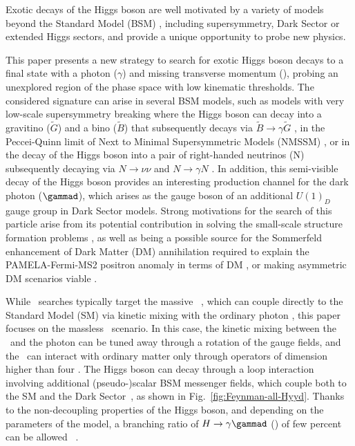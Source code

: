 Exotic decays of the Higgs boson are well motivated by a variety of models beyond the Standard Model (BSM) \cite{Curtin_2014}, including supersymmetry, Dark Sector or extended Higgs sectors, and provide a unique opportunity to probe new physics.  

This paper presents a new strategy to search for exotic Higgs boson decays to a final state with a photon ($\gamma$) and missing transverse momentum (\ETmiss), probing an unexplored region of the  phase space with low kinematic thresholds. 
The considered signature can arise %
in several BSM models, such as models with very low-scale supersymmetry breaking where the Higgs boson can decay into a gravitino ($\tilde{G}$) and a bino ($\tilde{B}$) that subsequently decays via $\tilde{B}\to\gamma\tilde{G}$ \cite{Petersson_2012}, in the Peccei-Quinn limit of Next to Minimal Supersymmetric Models (NMSSM) \cite{Suematsu_1998}, or in the decay of the Higgs boson into a pair of right-handed neutrinos (N) subsequently decaying via $N\to\nu\nu$ and $N\to\gamma N$ \cite{graesser2007}. 
In addition, this semi-visible decay of the Higgs boson provides an interesting production channel for the dark photon ($\gammad$), which arises as the gauge boson of an additional \( U(1)_D \) gauge group in Dark Sector models. Strong motivations for the search of this particle arise from its potential contribution in solving the small-scale structure formation problems \cite{Fan:2013tia} \cite{Heikinheimo:2015kra}, as well as being a possible source for the Sommerfeld enhancement of Dark Matter (DM) annihilation required to explain the PAMELA-Fermi-MS2 positron anomaly in terms of DM \cite{Arkani-Hamed:2008hhe}, or making asymmetric DM scenarios viable \cite{Zurek:2013wia}. 

While \gammad\  searches typically target the massive \gammad\ \cite{Beacham_2019,harris2022snowmasswhitepapernew,Deliyergiyev_2016}, which can couple directly to the Standard Model (SM) via kinetic mixing with the ordinary photon \cite{Fabbrichesi_2021}, this paper focuses on the massless \gammad\ scenario. %
In this case, the kinetic mixing between the \gammad\ and the photon can be tuned away through a rotation of the gauge fields, and the \gammad\ can interact with ordinary matter only through operators of dimension higher
than four \cite{Fabbrichesi_2021}. The Higgs boson can decay through a loop interaction involving additional (pseudo-)scalar BSM messenger fields, which couple both to the SM and the Dark Sector~\cite{Gabrielli:2014oya, Biswas:2016jsh}, as shown in 
Fig.~\ref{fig:Feynman-all-Hyyd}. Thanks to the non-decoupling properties of the Higgs boson, and depending on the parameters of the model, a branching ratio of $H\to\gamma\gammad$ (\br) of few percent can be allowed ~\cite{Beauchesne2023a, Beauchesne2023b}. 

